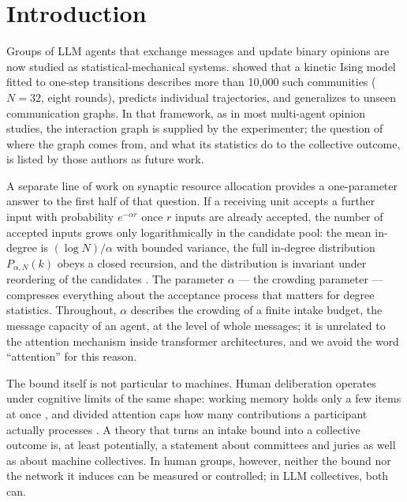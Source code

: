 \documentclass[11pt]{article}
\begin{document}
\section{Introduction}\label{sec:intro}

Groups of LLM agents that exchange messages and update binary opinions are now
studied as statistical-mechanical systems. \citet{El2026} showed that a kinetic
Ising model fitted to one-step transitions describes more than 10{,}000 such communities
($N = 32$, eight rounds), predicts individual trajectories, and generalizes to
unseen communication graphs. In that framework, as in most multi-agent opinion
studies, the interaction graph is supplied by the experimenter; the question of
where the graph comes from, and what its statistics do to the collective
outcome, is listed by those authors as future work.

A separate line of work on synaptic resource allocation provides a
one-parameter answer to the first half of that question. If a receiving unit
accepts a further input with probability $e^{-\alpha r}$ once $r$ inputs are
already accepted, the number of accepted inputs grows only logarithmically in
the candidate pool: the mean in-degree is $(\log N)/\alpha$ with bounded
variance, the full in-degree distribution $P_{\alpha,N}(k)$ obeys a closed
recursion, and the distribution is invariant under reordering of the
candidates \citep{SciRepCrowding}. The parameter $\alpha$ --- the crowding
parameter --- compresses everything about the acceptance process that matters
for degree statistics. Throughout, $\alpha$ describes the crowding of a finite intake budget, the message capacity of an agent, at the level of whole messages; it is unrelated to the attention
mechanism inside transformer architectures, and we avoid the word ``attention'' for this reason.

The bound itself is not particular to machines. Human deliberation operates under cognitive limits of the same shape: working memory holds only a few items at once \citep{Cowan2001}, and divided attention caps how many contributions a participant actually processes \citep{HodasLerman2012}. A theory that turns an intake bound into a collective outcome is, at least potentially, a statement about committees and juries as well as about machine collectives. In human groups, however, neither the bound nor the network it induces can be measured or controlled; in LLM collectives, both can.
\end{document}
